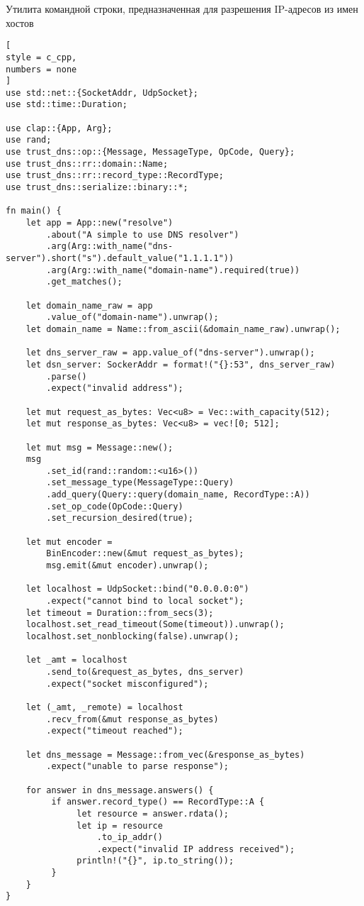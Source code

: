 \documentclass[%
	11pt,
	a4paper,
	utf8,
		]{article}
\begin{document}
Утилита командной строки, предназначенная для разрешения IP-адресов из имен хостов
\begin{lstlisting}[
style = c_cpp,
numbers = none
]
use std::net::{SocketAddr, UdpSocket};
use std::time::Duration;

use clap::{App, Arg};
use rand;
use trust_dns::op::{Message, MessageType, OpCode, Query};
use trust_dns::rr::domain::Name;
use trust_dns::rr::record_type::RecordType;
use trust_dns::serialize::binary::*;

fn main() {
    let app = App::new("resolve")
        .about("A simple to use DNS resolver")
        .arg(Arg::with_name("dns-server").short("s").default_value("1.1.1.1"))
        .arg(Arg::with_name("domain-name").required(true))
        .get_matches();
        
    let domain_name_raw = app
        .value_of("domain-name").unwrap();
    let domain_name = Name::from_ascii(&domain_name_raw).unwrap();
    
    let dns_server_raw = app.value_of("dns-server").unwrap();
    let dsn_server: SockerAddr = format!("{}:53", dns_server_raw)
        .parse()
        .expect("invalid address");
        
    let mut request_as_bytes: Vec<u8> = Vec::with_capacity(512);
    let mut response_as_bytes: Vec<u8> = vec![0; 512];
    
    let mut msg = Message::new();
    msg
        .set_id(rand::random::<u16>())
        .set_message_type(MessageType::Query)
        .add_query(Query::query(domain_name, RecordType::A))
        .set_op_code(OpCode::Query)
        .set_recursion_desired(true);
        
    let mut encoder = 
        BinEncoder::new(&mut request_as_bytes);
        msg.emit(&mut encoder).unwrap();
        
    let localhost = UdpSocket::bind("0.0.0.0:0")
        .expect("cannot bind to local socket");
    let timeout = Duration::from_secs(3);
    localhost.set_read_timeout(Some(timeout)).unwrap();
    localhost.set_nonblocking(false).unwrap();
    
    let _amt = localhost
        .send_to(&request_as_bytes, dns_server)
        .expect("socket misconfigured");
        
    let (_amt, _remote) = localhost
        .recv_from(&mut response_as_bytes)
        .expect("timeout reached");
        
    let dns_message = Message::from_vec(&response_as_bytes)
        .expect("unable to parse response");
        
    for answer in dns_message.answers() {
         if answer.record_type() == RecordType::A {
              let resource = answer.rdata();
              let ip = resource
                  .to_ip_addr()
                  .expect("invalid IP address received");
              println!("{}", ip.to_string());
         }
    }
}
\end{lstlisting}
\end{document}

